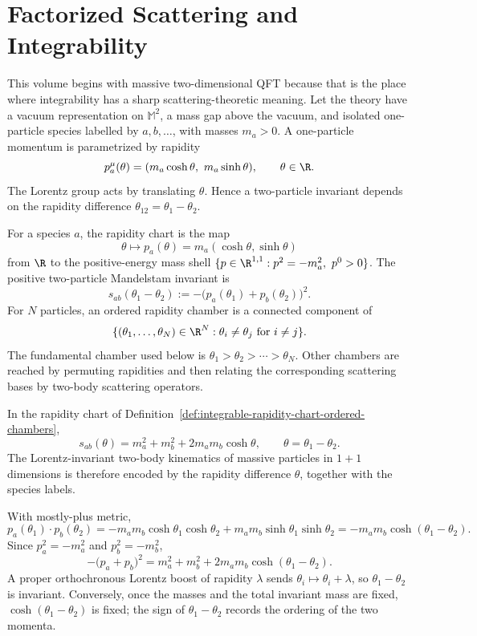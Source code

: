 \chapter{Factorized Scattering and Integrability}
\label{ch:integrable-factorized-scattering}

\ConventionsLorentzian

This volume begins with massive two-dimensional QFT because that is the place
where integrability has a sharp scattering-theoretic meaning.  Let the theory
have a vacuum representation on \(\mathbb M^2\), a mass gap above the vacuum,
and isolated one-particle species labelled by \(a,b,\ldots\), with masses
\(m_a>0\).  A one-particle momentum is parametrized by rapidity
\[
  p_a^\mu(\theta)
  =
  (m_a\cosh\theta,\ m_a\sinh\theta),
  \qquad \theta\in\R .
\]
The Lorentz group acts by translating \(\theta\).  Hence a two-particle
invariant depends on the rapidity difference \(\theta_{12}=\theta_1-\theta_2\).

\begin{definition}
\label{def:integrable-rapidity-chart-ordered-chambers}
For a species \(a\), the rapidity chart is the map
\[
  \theta\longmapsto p_a(\theta)=m_a(\cosh\theta,\sinh\theta)
\]
from \(\R\) to the positive-energy mass shell
\(\{p\in\R^{1,1}:p^2=-m_a^2,\ p^0>0\}\).  The positive two-particle
Mandelstam invariant is
\[
  s_{ab}(\theta_1-\theta_2)
  :=
  -\bigl(p_a(\theta_1)+p_b(\theta_2)\bigr)^2 .
\]
For \(N\) particles, an ordered rapidity chamber is a connected component of
\[
  \{(\theta_1,\ldots,\theta_N)\in\R^N:
    \theta_i\ne\theta_j\ \text{for }i\ne j\}.
\]
The fundamental chamber used below is
\(\theta_1>\theta_2>\cdots>\theta_N\).  Other chambers are reached by
permuting rapidities and then relating the corresponding scattering bases by
two-body scattering operators.
\end{definition}

\begin{remark}
\label{rem:two-particle-rapidity-kinematics}
In the rapidity chart of
Definition~\ref{def:integrable-rapidity-chart-ordered-chambers},
\[
  s_{ab}(\theta)
  =
  m_a^2+m_b^2+2m_am_b\cosh\theta,
  \qquad \theta=\theta_1-\theta_2 .
\]
The Lorentz-invariant two-body kinematics of massive particles in
\(1+1\) dimensions is therefore encoded by the rapidity difference
\(\theta\), together with the species labels.
\end{remark}

With mostly-plus metric,
\[
  p_a(\theta_1)\cdot p_b(\theta_2)
  =
  -m_am_b\cosh\theta_1\cosh\theta_2
  +m_am_b\sinh\theta_1\sinh\theta_2
  =
  -m_am_b\cosh(\theta_1-\theta_2).
\]
Since \(p_a^2=-m_a^2\) and \(p_b^2=-m_b^2\),
\[
  -\bigl(p_a+p_b\bigr)^2
  =
  m_a^2+m_b^2+2m_am_b\cosh(\theta_1-\theta_2).
\]
A proper orthochronous Lorentz boost of rapidity \(\lambda\) sends
\(\theta_i\mapsto\theta_i+\lambda\), so \(\theta_1-\theta_2\) is invariant.
Conversely, once the masses and the total invariant mass are fixed,
\(\cosh(\theta_1-\theta_2)\) is fixed; the sign of
\(\theta_1-\theta_2\) records the ordering of the two momenta.

